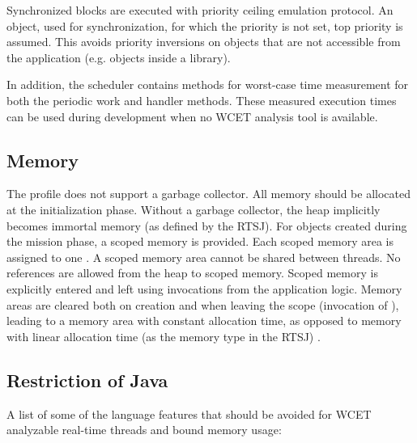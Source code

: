 Synchronized blocks are executed with priority ceiling emulation
protocol. An object, used for synchronization, for which the
priority is not set, top priority is assumed. This avoids priority
inversions on objects that are not accessible from the application
(e.g. objects inside a library).

In addition, the scheduler contains methods for worst-case time
measurement for both the periodic work and handler methods. These
measured execution times can be used during development when no WCET
analysis tool is available.

\subsection{Memory}

The profile does not support a garbage collector. All memory should
be allocated at the initialization phase. Without a garbage
collector, the heap implicitly becomes immortal memory (as defined
by the RTSJ). For objects created during the mission phase, a scoped
memory is provided. Each scoped memory area is assigned to one
. A scoped memory area cannot be shared between
threads. No references are allowed from the heap to scoped memory.
Scoped memory is explicitly entered and left using invocations from
the application logic. Memory areas are cleared both on creation and
when leaving the scope (invocation of ), leading
to a memory area with constant allocation time, as opposed to memory
with linear allocation time (as the memory type  in
the RTSJ) \cite{Corsaro:2003:DPR}.


\subsection{Restriction of Java}

A list of some of the language features that should be avoided for
WCET analyzable real-time threads and bound memory usage:

